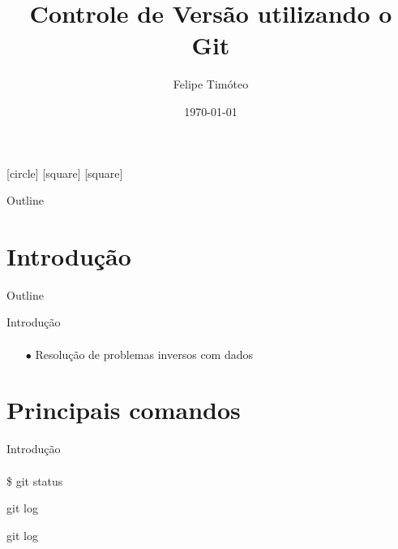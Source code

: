\documentclass[xcolor=dvipsnames,t]{beamer}
\title[Git]{Controle de Versão utilizando o  Git}
\author[Felipe]{Felipe Timóteo}
\institute{GISIS \& DOT UFF }
\date{\today}
\begin{document}
\begin{frame}
  \titlepage
\end{frame}

[circle]
[square]
[square]
\begin{frame}{Outline}
	\tiny
	\tableofcontents[pausesections]
\end{frame}

\section{Introdução}
\begin{frame}{Outline}
\tiny
\tableofcontents[current]
\end{frame}

\begin{frame}{Introdução}
\framesubtitle{}
\vfill	
\begin{itemize}
	\item[$ \bullet $] Resolução de problemas inversos com dados

\end{itemize}

\end{frame}

\section{Principais comandos}
\begin{frame}{}
	\tiny
	\tableofcontents[current]
\end{frame}

\begin{frame}{Introdução}
	\framesubtitle{}
	\vfill	
	\begin{block}{}
		\$ git status
	\end{block}
	
	\begin{exampleblock}{}
		git log
	\end{exampleblock}
	
	\begin{alertblock}{}
		git log
	\end{alertblock}
	

\end{frame}
\end{document}

